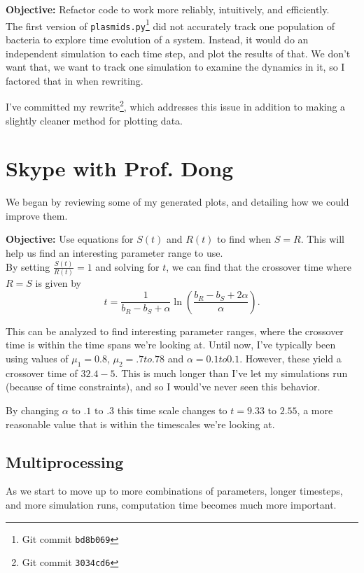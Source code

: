 \documentclass[oneside]{labbook}
\newcommand{\obj}[1]{\textbf{Objective:} #1\\}
\newcommand{\commit}[1]{\footnote{Git commit \texttt{#1}}}
\begin{document}
\obj{Refactor code to work more reliably, intuitively, and efficiently.}

The first version of \texttt{plasmids.py}\commit{bd8b069} did not accurately
track one population of bacteria to explore time evolution
of a system. Instead, it would do an independent simulation to each time step,
and plot the results of that. We don't want that, we want to track one simulation
to examine the dynamics in it, so I factored that in when rewriting.

I've committed my rewrite\commit{3034cd6}, which addresses this issue in addition
to making a slightly cleaner method for plotting data.


\section*{Skype with Prof. Dong}
We began by reviewing some of my generated plots, and detailing how we could
improve them.

\obj{Use equations for $S(t)$ and $R(t)$ to find when $S=R$. This will help
us find an interesting parameter range to use.}

By setting $\frac{S(t)}{R(t)}=1$ and solving for $t$, we can find that the
crossover time where $R=S$ is given by
\begin{equation}
t = \frac{1}{b_R - b_S + \alpha} \ln\left( \frac{b_R - b_S + 2 \alpha}{\alpha}\right).
\end{equation}

This can be analyzed to find interesting parameter ranges, where the crossover
time is within the time spans we're looking at. Until now, I've typically been
using values of $\mu_1=0.8$, $\mu_2=.7 { to } .78$ and $\alpha=0.1 { to } 0.1$.
However, these yield a crossover time of $32.4 - 5$. This is much longer than
I've let my simulations run (because of time constraints), and so I would've
never seen this behavior.

By changing $\alpha$ to $.1 \text{ to } .3$ this time scale changes to
 $t = 9.33 \text{ to } 2.55$, a more reasonable value that is within the timescales
we're looking at.

\subsection*{Multiprocessing}
As we start to move up to more combinations of parameters, longer timesteps,
and more simulation runs, computation time becomes much more important.
\end{document}

